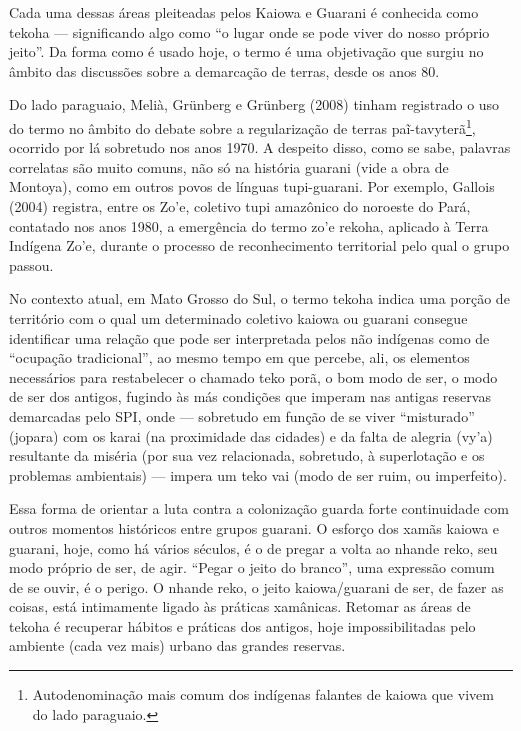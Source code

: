 Cada uma dessas áreas pleiteadas pelos Kaiowa e Guarani é conhecida como
tekoha — significando algo como ``o lugar onde se pode viver do nosso
próprio jeito''. Da forma como é usado hoje, o termo é uma objetivação
que surgiu no âmbito das discussões sobre a demarcação de terras, desde
os anos 80. 

Do lado paraguaio, Melià, Grünberg e Grünberg (2008) tinham registrado o
uso do termo no âmbito do debate sobre a regularização de terras
paĩ{}-tavyterã\footnote{Autodenominação mais comum dos indígenas
falantes de kaiowa que vivem do lado paraguaio.}, ocorrido por lá
sobretudo nos anos 1970. A despeito disso, como se sabe, palavras
correlatas são muito comuns, não só na história guarani (vide a obra de
Montoya), como em outros povos de línguas tupi-guarani. Por exemplo,
Gallois (2004) registra, entre os Zo’e, coletivo tupi amazônico do
noroeste do Pará, contatado nos anos 1980, a emergência do termo zo’e
rekoha, aplicado à Terra Indígena Zo’e, durante o processo de
reconhecimento territorial pelo qual o grupo passou. 

No contexto atual, em Mato Grosso do Sul, o termo tekoha indica uma
porção de território com o qual um determinado coletivo kaiowa ou
guarani consegue identificar uma relação que pode ser interpretada
pelos não indígenas como de ``ocupação tradicional'', ao mesmo tempo em
que percebe, ali, os elementos necessários para restabelecer o chamado
teko porã, o bom modo de ser, o modo de ser dos antigos, fugindo às más
condições que imperam nas antigas reservas demarcadas pelo SPI, onde —
sobretudo em função de se viver ``misturado'' (jopara) com os karai (na
proximidade das cidades) e da falta de alegria (vy’a) resultante da
miséria (por sua vez relacionada, sobretudo, à superlotação e os
problemas ambientais) — impera um teko vai (modo de ser ruim, ou
imperfeito).

Essa forma de orientar a luta contra a colonização guarda forte
continuidade com outros momentos históricos entre grupos guarani. O
esforço dos xamãs kaiowa e guarani, hoje, como há vários séculos, é o
de pregar a volta ao nhande reko, seu modo próprio de ser, de agir.
``Pegar o jeito do branco'', uma expressão comum de se ouvir, é o perigo.
O nhande reko, o jeito kaiowa/guarani de ser, de fazer as coisas, está
intimamente ligado às práticas xamânicas. Retomar as áreas de tekoha é
recuperar hábitos e práticas dos antigos, hoje impossibilitadas pelo
ambiente (cada vez mais) urbano das grandes reservas.

